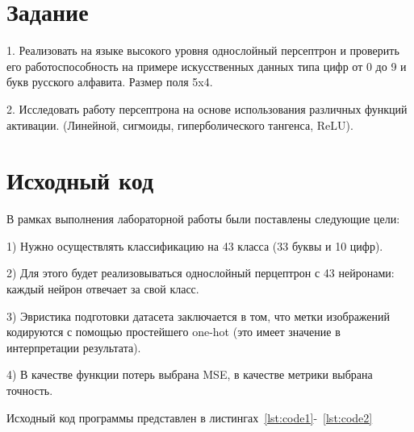 \documentclass[a4paper, 14pt]{extarticle}
\begin{document}
\renewcommand{\ttdefault}{pcr}

\setlength{\tabcolsep}{3pt}
\newpage
\setcounter{page}{2}

\section{Задание}\label{Sect::task}
1. Реализовать на языке высокого уровня однослойный персептрон и проверить его
работоспособность на примере искусственных данных типа цифр от 0 до 9 и букв
русского алфавита. Размер поля 5x4.

2. Исследовать работу персептрона на основе использования различных функций
активации. (Линейной, сигмоиды, гиперболического тангенса, ReLU).
\newpage
\section{Исходный код}

В рамках выполнения лабораторной работы были поставлены следующие цели:

1) Нужно осуществлять классификацию на 43 класса (33 буквы и 10 цифр).

2) Для этого будет реализовываться однослойный перцептрон с 43 нейронами: каждый нейрон отвечает за свой класс.

3) Эвристика подготовки датасета заключается в том, что метки изображений кодируются с помощью простейшего one-hot (это имеет значение в интерпретации результата).

4) В качестве функции потерь выбрана MSE, в качестве метрики выбрана точность.

Исходный код программы представлен в листингах~\ref{lst:code1}-~\ref{lst:code2}
\end{document}
